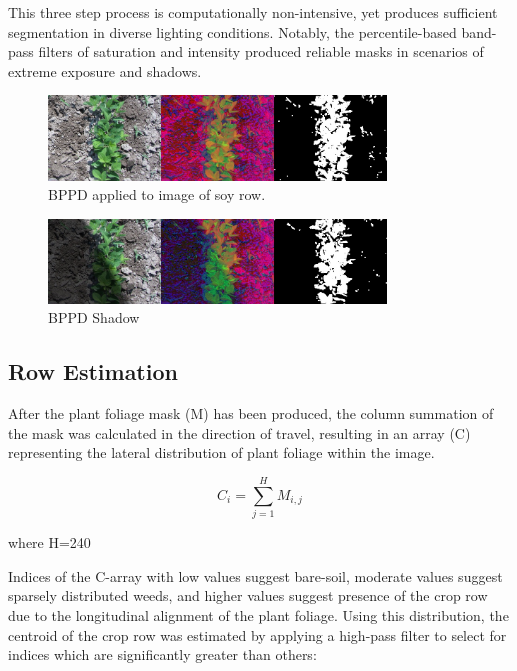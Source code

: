 \documentclass[authoryear]{elsarticle}
\begin{document}
This three step process is computationally non-intensive, yet produces
sufficient segmentation in diverse lighting conditions. Notably, the
percentile-based band-pass filters of saturation and intensity
produced reliable masks in scenarios of extreme exposure and shadows.

\begin{figure}
  \centering
  \includegraphics[width=0.8\textwidth,natwidth=610,natheight=642]{bppd_normal.jpg}
  \caption{BPPD applied to image of soy row.}
  \label{fig:bppd_normal}
\end{figure}

\begin{figure}
  \centering
  \includegraphics[width=0.8\textwidth,natwidth=610,natheight=642]{bppd_shadow.jpg}
  \caption{BPPD Shadow}
  \label{fig:bppd_shadow}
\end{figure}

\subsection{Row Estimation}
After the plant foliage mask (M) has been produced, the column
summation of the mask was calculated in the direction of travel,
resulting in an array (C) representing the lateral distribution of
plant foliage within the image. 

\begin{equation}
  C_{i} = \displaystyle\sum_{j=1}^{H} M_{i,j}
  \label{eq:col_sum}
\end{equation}
\begin{flushleft}
where H=240
\end{flushleft}

Indices of the C-array with low values suggest bare-soil, moderate
values suggest sparsely distributed weeds, and higher values suggest
presence of the crop row due to the longitudinal alignment of the
plant foliage. Using this distribution, the centroid of the crop row
was estimated by applying a high-pass filter to select for indices
which are significantly greater than others: 
\end{document}
